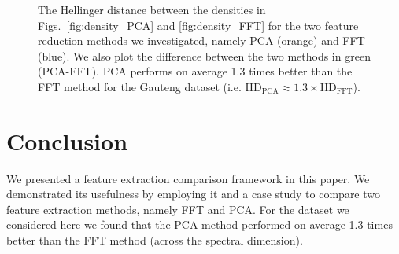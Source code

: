 \documentclass{article}
\begin{document}
% 
% 
% 

\begin{figure}[h]
\begin{minipage}[b]{1.0\linewidth}
   \centering
   \centerline{}
 \end{minipage}
 \caption{The Hellinger distance between the densities in Figs.~\ref{fig:density_PCA} and \ref{fig:density_FFT} for the two feature reduction methods we investigated, namely PCA (orange) and FFT (blue). We also plot the difference between the two methods in green (PCA-FFT). 
 PCA performs on average 1.3 times better than the FFT method for the Gauteng dataset (i.e. $\textrm{HD}_{\textrm{PCA}} \approx 1.3\times \textrm{HD}_{\textrm{FFT}}$).}
\label{fig:HD}
\end{figure}

\section{Conclusion}
\label{sec:ref}
We presented a feature extraction comparison framework in this paper. We demonstrated its usefulness by employing it and a case study to compare two feature extraction methods,
namely FFT and PCA. For the dataset we considered here we found that the PCA method performed on average 1.3 times better than the FFT method (across the spectral dimension).




\end{document}
